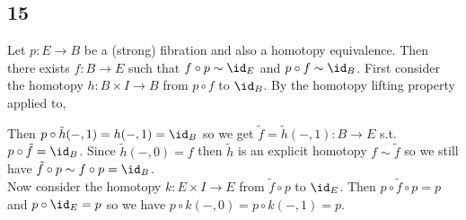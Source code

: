 \documentclass[12pt]{extarticle}
\begin{document}
\subsection{15}

Let $p : E \to B$ be a (strong) fibration and also a homotopy equivalence. Then there exists $f : B \to E$ such that $f \circ p \sim \id_E$ and $p \circ f \sim \id_B$.  First consider the homotopy $h : B \times I \to B$ from $p \circ f$ to $\id_B$. By the homotopy lifting property applied to,
\begin{center}
\end{center}
Then $p \circ \tilde{h}(-,1) = h(-,1) = \id_B$ so we get $\tilde{f} = \tilde{h}(-,1) : B \to E$ s.t. $p \circ \tilde{f} = \id_B$. Since $\tilde{h}(-,0) = f$ then $\tilde{h}$ is an explicit homotopy $f \sim \tilde{f}$ so we still have $\tilde{f} \circ p \sim f \circ p = \id_B$.
\bigskip\\
Now consider the homotopy $k : E \times I \to E$ from $\tilde{f} \circ p$ to $\id_E$. Then $p \circ \tilde{f} \circ p = p$ and $p \circ \id_E = p$ so we have $p \circ k(-,0) = p \circ k(-,1) = p$.
\end{document}
